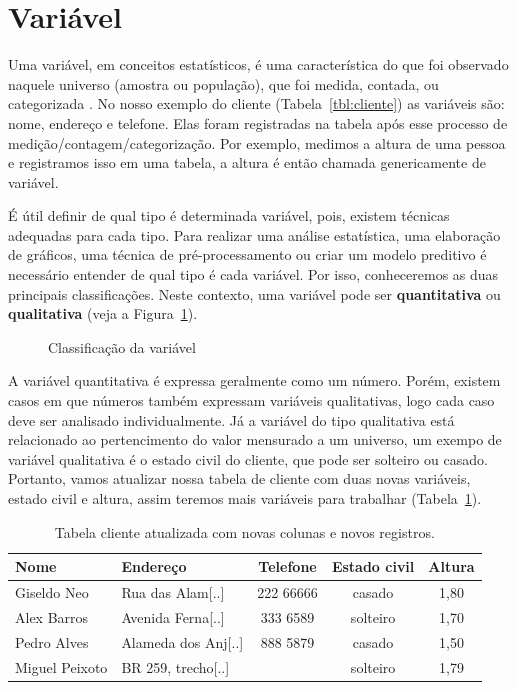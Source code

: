 \documentclass[a4paper,12pt]{book}
\begin{document}
\section{Variável}

Uma variável, em conceitos estatísticos, é uma característica do que foi observado naquele universo (amostra ou população), que foi medida,  contada, ou categorizada \cite{favero2017manual}. No nosso exemplo do cliente (Tabela~\ref{tbl:cliente}) as variáveis são: nome, endereço e telefone. Elas foram registradas na tabela após esse processo de medição/contagem/categorização. Por exemplo, medimos a altura de uma pessoa e registramos isso em uma tabela, a altura é então chamada genericamente de variável.

É útil definir de qual tipo é determinada variável, pois, existem técnicas adequadas para cada tipo. Para realizar uma análise estatística, uma elaboração de gráficos, uma técnica de pré-processamento ou criar um modelo preditivo é necessário entender de qual tipo é cada variável. Por isso, conheceremos as duas principais classificações. Neste contexto, uma variável pode ser \textbf{quantitativa} ou \textbf{qualitativa} (veja a Figura~\ref{fig:tipodado}).

\begin{figure}
	\centering
	\caption{Classificação da variável}
	\label{fig:tipodado}
\end{figure}

A variável quantitativa é expressa geralmente como um número. Porém, existem casos em que números também expressam variáveis qualitativas, logo cada caso deve ser analisado individualmente. Já a variável do tipo qualitativa está relacionado ao pertencimento do valor mensurado a um universo, um exempo de variável qualitativa é o estado civil do cliente, que pode ser solteiro ou casado. Portanto, vamos atualizar nossa tabela de cliente com duas novas variáveis, estado civil e altura, assim teremos mais variáveis para trabalhar (Tabela~\ref{tbl:cliente_v2}).

\begin{table}
	\centering
	\caption{Tabela cliente atualizada com novas colunas e novos registros.}
	\begin{tabular}{|l|l|c|c|c|}
	\hline
	\textbf{Nome} & \textbf{Endereço} & \textbf{Telefone} & \textbf{Estado civil} & \textbf{Altura} \\
	\hline
	Giseldo Neo & Rua das Alam[..] & 222 66666 & casado & 1,80\\
	\hline
	Alex Barros & Avenida Ferna[..]& 333 6589 & solteiro & 1,70 \\
	\hline
	Pedro Alves & Alameda dos Anj[..]& 888 5879 & casado & 1,50 \\
	\hline
	Miguel Peixoto & BR 259, trecho[..]&  & solteiro & 1,79 \\
	\hline
	\end{tabular}
	\label{tbl:cliente_v2}
\end{table}
\end{document}
